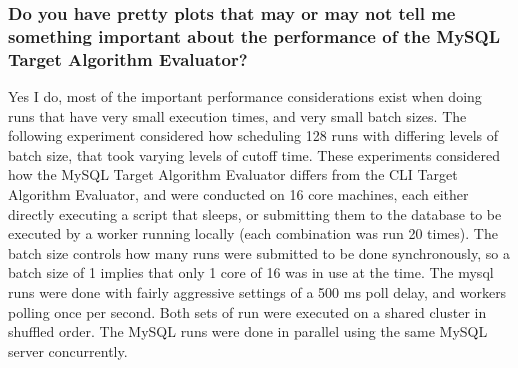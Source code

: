 \documentclass[11pt,letterpaper,oneside]{article}
\begin{document}
\subsubsection{Do you have pretty plots that may or may not tell me something important about the performance of the MySQL Target Algorithm Evaluator?}
\label{faq:plots}
Yes I do, most of the important performance considerations exist when doing runs that have very small execution times, and very small batch sizes. The following experiment considered how scheduling 128 runs with differing levels of batch size, that took varying levels of cutoff time. These experiments considered how the MySQL Target Algorithm Evaluator differs from the CLI Target Algorithm Evaluator, and were conducted on 16 core machines, each either directly executing a script that sleeps, or submitting them to the database to be executed by a worker running locally (each combination was run 20 times). The batch size controls how many runs were submitted to be done synchronously, so a batch size of 1 implies that only 1 core of 16 was in use at the time. The mysql runs were done with fairly aggressive settings of a 500 ms poll delay, and workers polling once per second. Both sets of run were executed on a shared cluster in shuffled order. The MySQL runs were done in parallel using the same MySQL server concurrently.
\end{document}

